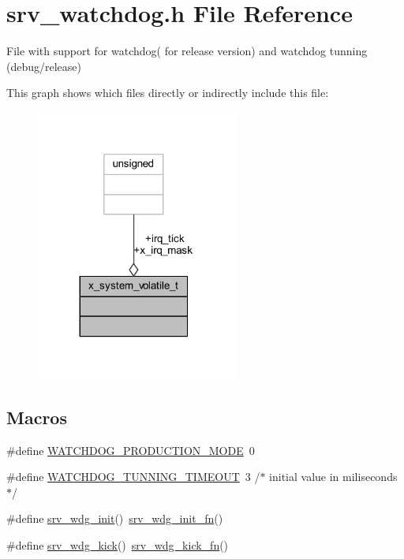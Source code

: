 \hypertarget{a00067}{\section{srv\+\_\+watchdog.\+h File Reference}
\label{a00067}
}


File with support for watchdog( for release version) and watchdog tunning (debug/release)  


This graph shows which files directly or indirectly include this file\+:\nopagebreak
\begin{figure}[H]
\begin{center}
\leavevmode
\includegraphics[width=188pt]{d4/d26/a01700}
\end{center}
\end{figure}
\subsection*{Macros}
\begin{DoxyCompactItemize}
\item 
\#define \hyperlink{a00067_afbfc46dbf4e78e184942fc2cbe77dbb3}{W\+A\+T\+C\+H\+D\+O\+G\+\_\+\+P\+R\+O\+D\+U\+C\+T\+I\+O\+N\+\_\+\+M\+O\+D\+E}~0
\item 
\#define \hyperlink{a00067_aaf1a99e6db8062353e5f10d1f7d02938}{W\+A\+T\+C\+H\+D\+O\+G\+\_\+\+T\+U\+N\+N\+I\+N\+G\+\_\+\+T\+I\+M\+E\+O\+U\+T}~3 /$\ast$ initial value in miliseconds $\ast$/
\item 
\#define \hyperlink{a00067_a8a83a885a73db05d7faa34734d132644}{srv\+\_\+wdg\+\_\+init}()~\hyperlink{a00066_a37c35718860234f09b8cef8680e1cc09}{srv\+\_\+wdg\+\_\+init\+\_\+fn}()
\item 
\#define \hyperlink{a00067_a710d148845397582739d170341f3d3d9}{srv\+\_\+wdg\+\_\+kick}()~\hyperlink{a00066_ac6f811346b702c404d5e6cdfb9262767}{srv\+\_\+wdg\+\_\+kick\+\_\+fn}()
\end{DoxyCompactItemize}

